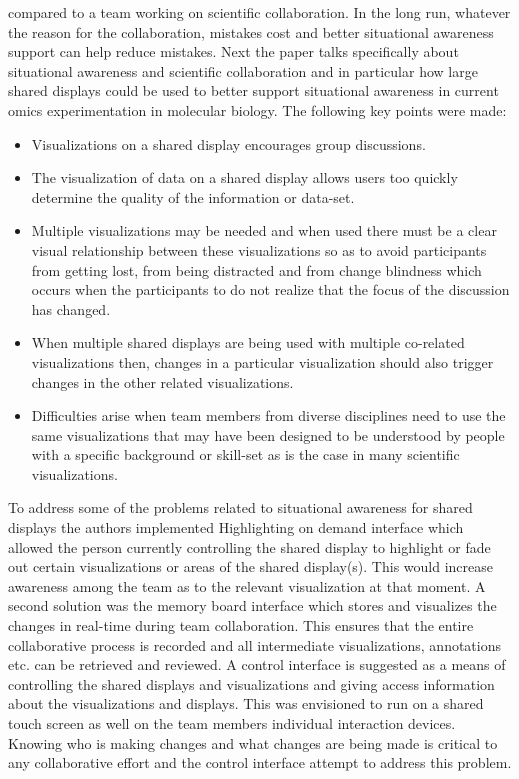 \documentclass{sig-alternate}
\begin{document}
compared to a team working on scientific collaboration. In the long run,
whatever the reason for the collaboration, mistakes cost and better situational
awareness support can help reduce mistakes.
Next the paper talks specifically about situational awareness and scientific
collaboration and in particular how large shared displays could be used to
better support situational awareness in current omics experimentation in
molecular biology. The following key points were made:
\begin{itemize}
  \item Visualizations on a shared display encourages group discussions.
  \item The visualization of data on a shared display allows users too quickly
  determine the quality of the information or data-set.
  \item Multiple visualizations may be needed and when used there must be a
  clear visual relationship between these visualizations so as to avoid
 participants from getting lost, from being distracted and from change blindness
  which occurs when the participants to do not realize that the focus of the
  discussion has changed.
  \item When multiple shared displays are being used with multiple co-related
  visualizations then, changes in a particular visualization should also trigger
  changes in the other related visualizations.
  \item Difficulties arise when team members from diverse disciplines need to
  use the same visualizations that may have been designed to be understood by
  people with a specific background or skill-set as is the case in many
  scientific visualizations.
\end{itemize}
To address some of the problems related to situational awareness for shared
displays the authors implemented Highlighting on demand interface which allowed
the person currently controlling the shared display to highlight or fade out
certain visualizations or areas of the shared display(s). This would increase
awareness among the team as to the relevant visualization at that moment. A
second solution was the memory board interface which stores and visualizes the
changes in real-time during team collaboration. This ensures that the entire
collaborative process is recorded and all intermediate visualizations,
annotations etc. can be retrieved and reviewed. A control interface is
suggested as a means of controlling the shared displays and visualizations and
giving access information about the visualizations and displays. This
was envisioned to run on a shared touch screen as well on the team members
individual interaction devices. Knowing who is making changes and what changes
are being made is critical to any collaborative effort and the control interface
attempt to address this problem.
\end{document}
